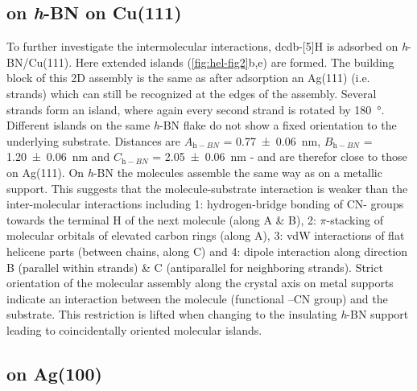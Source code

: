 \subsection{on \textit{h}-BN on Cu(111)}
To further investigate the intermolecular interactions, dcdb-[5]H is adsorbed on \textit{h}-BN/Cu(111). Here extended islands (\autoref{fig:hel-fig2}b,e) are formed. The building block of this 2D assembly is the same as after adsorption an Ag(111) (i.e. strands) which can still be recognized at the edges of the assembly. Several strands form an island, where again every second strand is rotated by \SI{180}{\degree}. Different islands on the same \textit{h}-BN flake do not show a fixed orientation to the underlying substrate. Distances are $A_{\textit{h}-BN}$ = \SI{0.77 \pm 0.06}{\nano \meter}, $B_{\textit{h}-BN}$ = \SI{1.20 \pm 0.06}{\nano \meter} and $C_{\textit{h}-BN}$ = \SI{2.05 \pm 0.06}{\nano \meter} - and are therefor close to those on Ag(111). On \textit{h}-BN the molecules assemble the same way as on a metallic support. This suggests that the molecule-substrate interaction is weaker than the inter-molecular interactions including 1: hydrogen-bridge bonding of CN- groups towards the terminal H of the next molecule (along A \& B), 2: $\pi$-stacking of molecular orbitals of elevated carbon rings (along A), 3: vdW interactions of flat helicene parts (between chains, along C) and 4: dipole interaction along direction B (parallel within strands) \& C (antiparallel for neighboring strands). Strict orientation of the molecular assembly along the crystal axis on metal supports indicate an interaction between the molecule (functional –CN group) and the substrate. This restriction is lifted when changing to the insulating \textit{h}-BN support leading to coincidentally oriented molecular islands.

\subsection{on Ag(100)}

